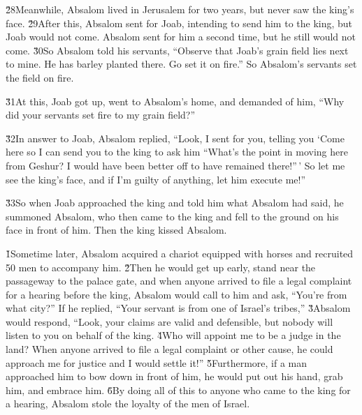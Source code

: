\v{28}Meanwhile, Absalom lived in Jerusalem for two years, but never saw the king's face. \v{29}After this, Absalom sent for Joab, intending to send him to the king, but Joab would not come. Absalom sent for him a second time, but he still would not come. \v{30}So Absalom told his servants, ``Observe that Joab's grain field lies next to mine. He has barley planted there. Go set it on fire.'' So Absalom's servants set the field on fire.

\v{31}At this, Joab got up, went to Absalom's home, and demanded of him, ``Why did your servants set fire to my grain field?''

\v{32}In answer to Joab, Absalom replied, ``Look, I sent for you, telling you `Come here so I can send you to the king to ask him ``What's the point in moving here from Geshur? I would have been better off to have remained there!''\,' So let me see the king's face, and if I'm guilty of anything, let him execute me!''

\v{33}So when Joab approached the king and told him what Absalom had said, he summoned Absalom, who then came to the king and fell to the ground on his face in front of him. Then the king kissed Absalom.

\v{1}Sometime later, Absalom acquired a chariot equipped with horses and recruited 50 men to accompany him. \v{2}Then he would get up early, stand near the passageway to the palace gate, and when anyone arrived to file a legal complaint for a hearing before the king, Absalom would call to him and ask, ``You're from what city?'' If he replied, ``Your servant is from one of Israel's tribes,'' \v{3}Absalom would respond, ``Look, your claims are valid and defensible, but nobody will listen to you on behalf of the king. \v{4}Who will appoint me to be a judge in the land? When anyone arrived to file a legal complaint or other cause, he could approach me for justice and I would settle it!'' \v{5}Furthermore, if a man approached him to bow down in front of him, he would put out his hand, grab him, and embrace him. \v{6}By doing all of this to anyone who came to the king for a hearing, Absalom stole the loyalty of the men of Israel.

